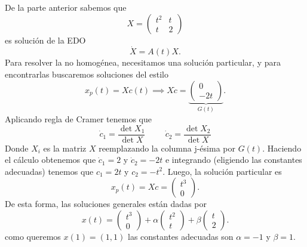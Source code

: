\documentclass[10pt]{article}
\begin{document}
\begin{plist}
\item De la parte anterior sabemos que
\[
    X = \begin{pmatrix} t^2 & t\\ t & 2 \end{pmatrix}
\]
es solución de la EDO
\[
    \dot{X} = A(t) X
.\]
Para resolver la no homogénea, necesitamos una solución particular, y para
encontrarlas buscaremos soluciones del estilo
\[
    x_p(t) = X c(t)
    \implies
    X\dot{c} = \underbrace{\begin{pmatrix} 0 \\ -2t \end{pmatrix}}_{G(t)}
.\]
Aplicando regla de Cramer tenemos que
\[
    \dot{c}_1 = \frac{\det X_1}{\det X}
    \hspace{1cm}
    \dot{c}_2 = \frac{\det X_2}{\det X}
\]
Donde \(X_i\) es la matriz \(X\) reemplazando la columna j-ésima por \(G(t)\).
Haciendo el cálculo obtenemos que \(\dot{c}_1 = 2\) y \(\dot{c}_2 = -2t\) e
integrando (eligiendo las constantes adecuadas) tenemos que \(c_1 = 2t\) y \(c_2
= -t^2\). Luego, la solución particular es
\[
    x_p(t) = Xc = \begin{pmatrix} t^3 \\ 0 \end{pmatrix}
.\]
De esta forma, las soluciones generales están dadas por
\[
    x(t) =
    \begin{pmatrix} t^3 \\ 0 \end{pmatrix}
    +
    \alpha \begin{pmatrix} t^2 \\ t \end{pmatrix}
    +
    \beta \begin{pmatrix} t \\ 2 \end{pmatrix}
.\]
como queremos \(x(1) = (1,1)\) las constantes adecuadas son \(\alpha = -1\) y
\(\beta = 1\).
\end{plist}
\end{document}
